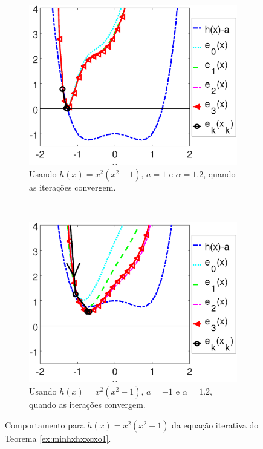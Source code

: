 \begin{figure}[!h]
    \centering
    \begin{subfigure}[b]{0.49\textwidth}
        \includegraphics[width=\textwidth]{chapters/minimization-hx/mfiles/hx_a_alphax_last/minimizando_hx_a_alphax_1.eps}
        \caption{Usando $h(x)=x^2(x^2-1)$, $a=1$ e $\alpha=1.2$, quando as iterações convergem.}
        \label{fig:hxccasesa}
    \end{subfigure}
    ~ %
    \begin{subfigure}[b]{0.49\textwidth}
        \includegraphics[width=\textwidth]{chapters/minimization-hx/mfiles/hx_a_alphax_last/minimizando_hx_a_alphax_2.eps}
        \caption{Usando $h(x)=x^2(x^2-1)$, $a=-1$ e $\alpha=1.2$, quando as iterações convergem.}
        \label{fig:hxccasesb}
    \end{subfigure}
    \caption{Comportamento para $h(x)=x^2(x^2-1)$ da equação iterativa do Teorema \ref{ex:minhxhxxoxo1}.}
    \label{fig:hxccases}
\end{figure}

